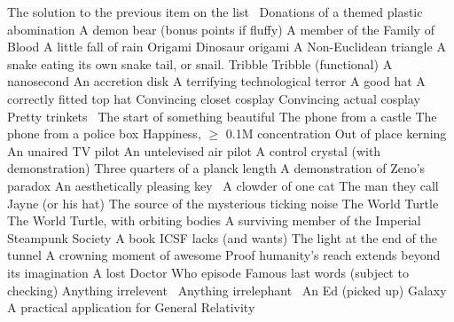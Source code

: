 \begin{multicols}{2}
\begin{small}
\begin{tabbing}
          {The solution to the previous item on the list~\E}
          {Donations of a themed plastic abomination}
           {A demon bear (bonus points if fluffy)}
           {A member of the Family of Blood}
           {A little fall of rain}
           {Origami}
          {Dinosaur origami}
           {A Non-Euclidean triangle}
           {A snake eating its own snake tail, or snail.}
           {Tribble}
          {Tribble (functional)}
           {A nanosecond}
          {An accretion disk}
          {A terrifying technological terror}
           {A good hat}
           {A correctly fitted top hat}
           {Convincing closet cosplay}
          {Convincing actual cosplay}
          {Pretty trinkets~\FD}
           {The start of something beautiful}
          {The phone from a castle}
          {The phone from a police box}
          {Happiness, $\ge$ 0.1M concentration}
          {Out of place kerning}
          {An unaired TV pilot}
          {An untelevised air pilot}
          {A control crystal (with demonstration)}
          {Three quarters of a planck length}
          {A demonstration of Zeno's paradox}
          {An aesthetically pleasing key~\FD}
          {A clowder of one cat}
           {The man they call Jayne (or his hat)}
         {The source of the mysterious ticking noise}
         {The World Turtle}
         {The World Turtle, with orbiting bodies}
          {A surviving member of the Imperial Steampunk Society}
          {A book ICSF lacks (and wants)}
           {The light at the end of the tunnel}
           {A crowning moment of awesome}
          {Proof humanity's reach extends beyond its imagination}
          {A lost Doctor Who episode}
           {Famous last words (subject to checking)}
          {Anything irrelevent~\E}
          {Anything irrelephant~\E}
           {An Ed (picked up)}
           {Galaxy}
           {A practical application for General Relativity}

\end{tabbing}
\end{small}
\end{multicols}
